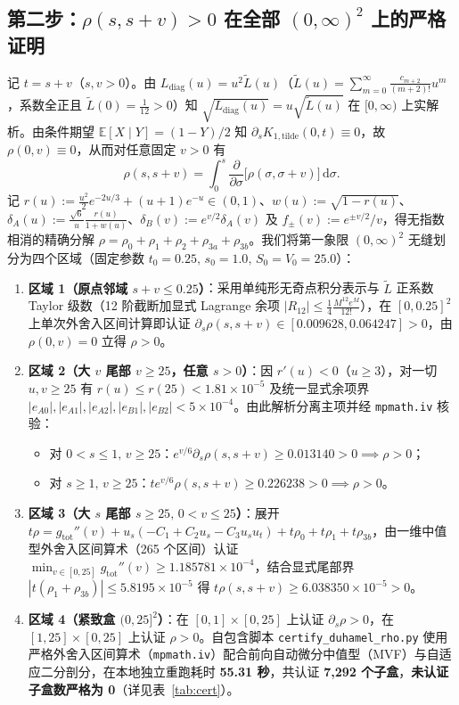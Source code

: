 \documentclass[11pt,a4paper]{article}
\theoremstyle{remark}
\begin{document}
\subsection{第二步：$\rho(s, s+v) > 0$ 在全部 $(0,\infty)^2$ 上的严格证明}

记 $t = s+v$（$s, v > 0$）。由 $L_{\mathrm{diag}}(u) = u^2 \tilde{L}(u)$（$\tilde{L}(u) = \sum_{m=0}^\infty \frac{c_{m+2}}{(m+2)!}u^m$，系数全正且 $\tilde{L}(0)=\frac{1}{12}>0$）知 $\sqrt{L_{\mathrm{diag}}(u)} = u\sqrt{\tilde{L}(u)}$ 在 $[0,\infty)$ 上实解析。由条件期望 $\mathbb{E}[X\mid Y]=(1-Y)/2$ 知 $\partial_s K_{1,\mathrm{tilde}}(0, t) \equiv 0$，故 $\rho(0, v) \equiv 0$，从而对任意固定 $v > 0$ 有
\[
\rho(s, s+v) = \int_0^s \frac{\partial}{\partial \sigma}\big[\rho(\sigma, \sigma+v)\big]\,\mathrm{d}\sigma.
\]
记 $r(u) := \frac{u^2}{2}e^{-2u/3} + (u+1)e^{-u} \in (0,1)$、$w(u) := \sqrt{1-r(u)}$、$\delta_A(u) := \frac{\sqrt{6}}{u}\frac{r(u)}{1+w(u)}$、$\delta_B(v) := e^{v/2}\delta_A(v)$ 及 $f_\pm(v) := e^{\pm v/2}/v$，得无指数相消的精确分解 $\rho = \rho_0 + \rho_1 + \rho_2 + \rho_{3a} + \rho_{3b}$。我们将第一象限 $(0,\infty)^2$ 无缝划分为四个区域（固定参数 $t_0 = 0.25,\, s_0 = 1.0,\, S_0 = V_0 = 25.0$）：

\begin{enumerate}
  \item \textbf{区域 1（原点邻域 $s+v \le 0.25$）}：采用单纯形无奇点积分表示与 $\tilde{L}$ 正系数 Taylor 级数（12 阶截断加显式 Lagrange 余项 $|R_{12}| \le \frac{1}{4}\frac{M^{12}e^M}{12!}$），在 $[0, 0.25]^2$ 上单次外舍入区间计算即认证 $\partial_s\rho(s, s+v) \in [0.009628, 0.064247] > 0$，由 $\rho(0,v)=0$ 立得 $\rho > 0$。
  \item \textbf{区域 2（大 $v$ 尾部 $v \ge 25$，任意 $s > 0$）}：因 $r'(u) < 0$（$u\ge 3$），对一切 $u,v \ge 25$ 有 $r(u) \le r(25) < 1.81\times 10^{-5}$ 及统一显式余项界 $|e_{A0}|,|e_{A1}|,|e_{A2}|,|e_{B1}|,|e_{B2}| < 5\times 10^{-4}$。由此解析分离主项并经 \texttt{mpmath.iv} 核验：
  \begin{itemize}
    \item 对 $0 < s \le 1,\, v \ge 25$：$e^{v/6}\partial_s\rho(s, s+v) \ge 0.013140 > 0 \implies \rho > 0$；
    \item 对 $s \ge 1,\, v \ge 25$：$t e^{v/6}\rho(s, s+v) \ge 0.226238 > 0 \implies \rho > 0$。
  \end{itemize}
  \item \textbf{区域 3（大 $s$ 尾部 $s \ge 25,\, 0 < v \le 25$）}：展开 $t\rho = g_{\mathrm{tot}}''(v) + u_s(-C_1 + C_2 u_s - C_3 u_s u_t) + t\rho_0 + t\rho_1 + t\rho_{3b}$，由一维中值型外舍入区间算术（265 个区间）认证 $\min_{v\in[0,25]} g_{\mathrm{tot}}''(v) \ge 1.185781\times 10^{-4}$，结合显式尾部界 $|t(\rho_1+\rho_{3b})| \le 5.8195\times 10^{-5}$ 得 $t\rho(s,s+v) \ge 6.038350\times 10^{-5} > 0$。
  \item \textbf{区域 4（紧致盒 $(0,25]^2$）}：在 $[0,1]\times[0,25]$ 上认证 $\partial_s\rho > 0$，在 $[1,25]\times[0,25]$ 上认证 $\rho > 0$。自包含脚本 \texttt{certify\_duhamel\_rho.py} 使用严格外舍入区间算术（\texttt{mpmath.iv}）配合前向自动微分中值型（MVF）与自适应二分剖分，在本地独立重跑耗时 \textbf{55.31 秒}，共认证 \textbf{7,292 个子盒}，\textbf{未认证子盒数严格为 0}（详见表~\ref{tab:cert}）。
\end{enumerate}
\end{document}

